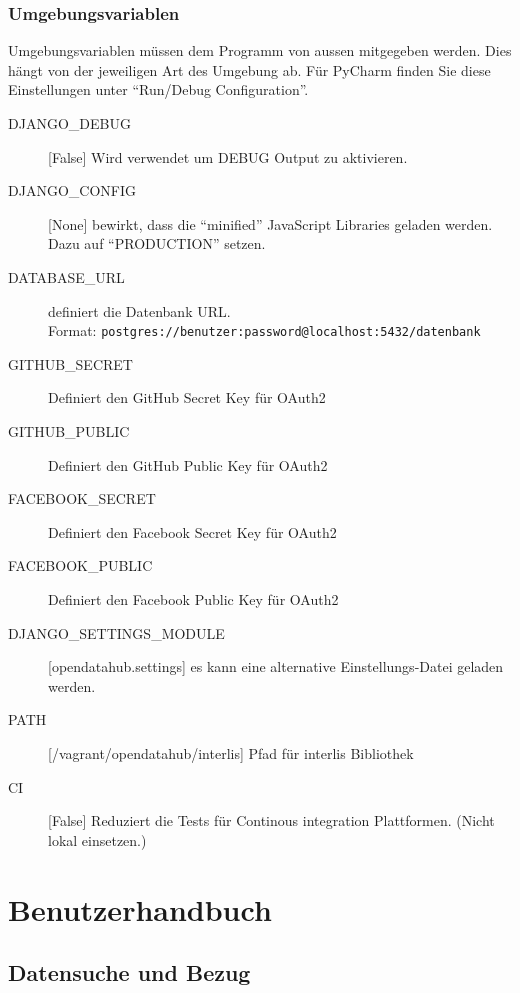 \subsection{Umgebungsvariablen} \label{sec:sd:umgebungsvariablen}
Umgebungsvariablen müssen dem Programm von aussen mitgegeben werden. Dies hängt von der jeweiligen Art des Umgebung ab. Für PyCharm finden Sie diese Einstellungen unter ``Run/Debug Configuration''.


\begin{description}
\item[DJANGO\_DEBUG]{[}False{]} Wird verwendet um DEBUG Output zu aktivieren. 
\item[DJANGO\_CONFIG]{[}None{]} bewirkt, dass die ``minified'' JavaScript Libraries geladen werden. Dazu auf ``PRODUCTION'' setzen.
\item[DATABASE\_URL] definiert die Datenbank URL. \\Format: \texttt{postgres://benutzer:password@localhost:5432/datenbank}
\item[GITHUB\_SECRET] Definiert den GitHub Secret Key für OAuth2
\item[GITHUB\_PUBLIC] Definiert den GitHub Public Key für OAuth2
\item[FACEBOOK\_SECRET] Definiert den Facebook Secret Key für OAuth2
\item[FACEBOOK\_PUBLIC] Definiert den Facebook Public Key für OAuth2
\item[DJANGO\_SETTINGS\_MODULE]{[}opendatahub.settings{]} es kann eine alternative Einstellungs-Datei geladen werden.
\item[PATH]{[}/vagrant/opendatahub/interlis{]} Pfad für interlis Bibliothek
\item[CI]{[}False{]} Reduziert die Tests für Continous integration Plattformen. (Nicht lokal einsetzen.)
\end{description}
\chapter{Benutzerhandbuch}

\section{Datensuche und Bezug} \label{sec:sd:daten-suchen}


